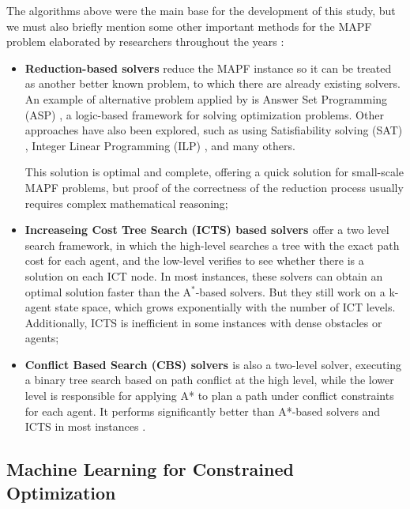 The algorithms above were the main base for the development of this study, but we must also briefly mention some other important methods for the MAPF problem elaborated by researchers throughout the years \cite{gaoReviewGraphbasedMultiagent2024}:
\begin{itemize}
    \item \textbf{Reduction-based solvers} reduce the MAPF instance so it can be treated as another better known problem, to which there are already existing solvers. 
    An example of alternative problem applied by \cite{gomezSolvingSumofCostsMultiAgent2020} is Answer Set Programming (ASP) \cite{lifschitzWhatAnswerSet}, a logic-based framework for solving optimization problems. Other approaches have also been explored, such as using Satisfiability solving (SAT) \cite{surynekEfficientSATApproach2016}, Integer Linear Programming (ILP) \cite{yuOptimalMultirobotPath2016}, and many others.
    
    This solution is optimal and complete, offering a quick solution for small-scale MAPF problems, but proof of the correctness of the reduction process usually requires complex mathematical reasoning;
    \item \textbf{Increaseing Cost Tree Search (ICTS) based solvers \cite{sharonIncreasingCostTree2013}} offer a two level search framework, in which the high-level searches a tree with the exact path cost for each agent, and the low-level verifies to see whether there is a solution on each ICT node. In most instances, these solvers can obtain an optimal solution faster than the A$^*$-based solvers. But they still work on a k-agent state space, which grows exponentially with the number of ICT levels. Additionally, ICTS is inefficient in some instances with dense obstacles or agents;
    \item \textbf{Conflict Based Search (CBS) solvers \cite{sharonConflictbasedSearchOptimal2015} \cite{liEECBSBoundedSuboptimalSearch2021}} is also a two-level solver, executing a binary tree search based on path conflict at the high level, while the lower level is responsible for applying A* to plan a path under conflict constraints for each agent. It performs significantly better than A*-based solvers and ICTS in most instances \cite{gaoReviewGraphbasedMultiagent2024}.
    
\end{itemize}

\subsection{Machine Learning for Constrained Optimization}

